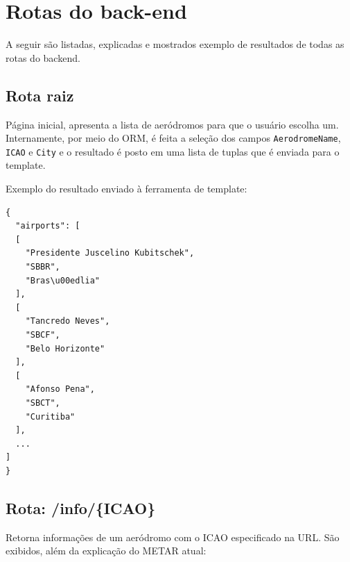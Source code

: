 \chapter{Rotas do back-end}

A seguir são listadas, explicadas e mostrados exemplo de resultados de todas as rotas do backend.

\section{Rota raiz}

Página inicial, apresenta a lista de aeródromos para que o usuário escolha um. 
Internamente, por meio do ORM, é feita a seleção dos campos \texttt{AerodromeName},
\texttt{ICAO} e \texttt{City} e o resultado é posto em uma lista de tuplas que é 
enviada para o template.

Exemplo do resultado enviado à ferramenta de template:
\begin{smaller}
\begin{verbatim}
{
  "airports": [
  [
    "Presidente Juscelino Kubitschek",
    "SBBR",
    "Bras\u00edlia"
  ],
  [
    "Tancredo Neves",
    "SBCF",
    "Belo Horizonte"
  ],
  [
    "Afonso Pena",
    "SBCT",
    "Curitiba"
  ],
  ...
]
}
\end{verbatim}
\end{smaller}


\section{Rota: /info/\{ICAO\}}

Retorna informações de um aeródromo com o ICAO especificado na URL. São exibidos,
além da explicação do METAR atual:

